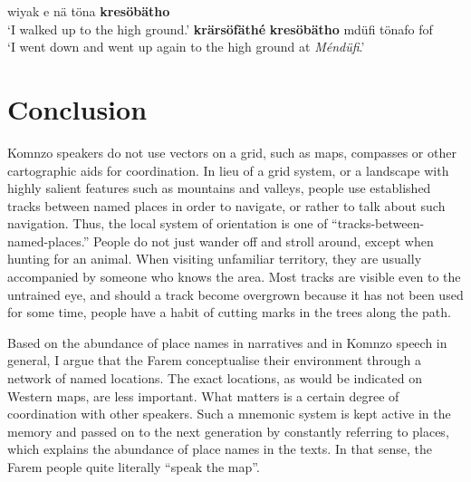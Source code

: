 \ea\label{ex:mndüfi}
    \ea
        wiyak e nä töna \textbf{kresöbätho}\\
        \glt `I walked up to the high ground.'
    \ex 
        \textbf{krärsöfäthé} \textbf{kresöbätho} mdüfi tönafo fof\\
        \glt `I went down and went up again to the high ground at \textit{Méndüfi}.'
\z
\z

\section{Conclusion}
Komnzo speakers do not use vectors on a grid, such as maps, compasses or other cartographic aids for coordination. In lieu of a grid system, or a landscape with highly salient features such as mountains and valleys, people use established tracks between named places in order to navigate, or rather to talk about such navigation. Thus, the local system of orientation is one of ``tracks-between-named-places.'' People do not just wander off and stroll around, except when hunting for an animal. When visiting unfamiliar territory, they are usually accompanied by someone who knows the area. Most tracks are visible even to the untrained eye, and should a track become overgrown because it has not been used for some time, people have a habit of cutting marks in the trees along the path.

Based on the abundance of place names in narratives and in Komnzo speech in general, I argue that the Farem conceptualise their environment through a network of named locations. The exact locations, as would be indicated on Western maps, are less important. What matters is a certain degree of coordination with other speakers. Such a mnemonic system is kept active in the memory and passed on to the next generation by constantly referring to places, which explains the abundance of place names in the texts. In that sense, the Farem people quite literally ``speak the map''.
